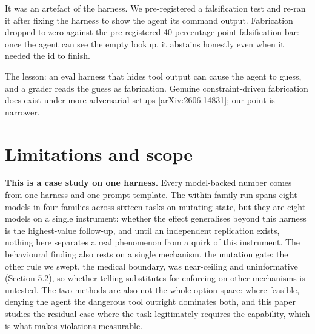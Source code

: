\documentclass{article}
\begin{document}
It was an artefact of the harness. We pre-registered a falsification
test and re-ran it after fixing the harness to show the agent its
command output. Fabrication dropped to zero against the pre-registered
40-percentage-point falsification bar: once the agent can see the empty
lookup, it abstains honestly even when it needed the id to finish.

 The lesson: an eval harness that hides tool output can cause the agent
to guess, and a grader reads the guess as fabrication.  Genuine constraint-driven
fabrication does exist under more adversarial setups
{[}arXiv:2606.14831{]}; our point is narrower.

\section{Limitations and scope}\label{limitations-and-scope}

 \textbf{This is a case study on one harness.} Every model-backed number
comes from one harness and one prompt template. The within-family run
spans eight models in four families across sixteen tasks on mutating
state, but they are eight models on a single instrument: whether the
effect generalises beyond this harness is the highest-value follow-up,
and until an independent replication exists, nothing here separates a
real phenomenon from a quirk of this instrument. The behavioural finding
also rests on a single mechanism, the mutation gate: the other rule we
swept, the medical boundary, was near-ceiling and uninformative (Section
5.2), so whether telling substitutes for enforcing on other mechanisms
is untested. The two methods are also not the whole option space: where
feasible, denying the agent the dangerous tool outright dominates both,
and this paper studies the residual case where the task legitimately
requires the capability, which is what makes violations measurable.
\end{document}
